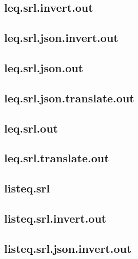 \subsection{leq.srl.invert.out}
\label{app:leq_srl.invert.out}

\subsection{leq.srl.json.invert.out}
\label{app:leq_srl.json.invert.out}

\subsection{leq.srl.json.out}
\label{app:leq_srl.json.out}

\subsection{leq.srl.json.translate.out}
\label{app:leq_srl.json.translate.out}

\subsection{leq.srl.out}
\label{app:leq_srl.out}

\subsection{leq.srl.translate.out}
\label{app:leq_srl.translate.out}

\subsection{listeq.srl}
\label{app:listeq_srl}

\subsection{listeq.srl.invert.out}
\label{app:listeq_srl.invert.out}

\subsection{listeq.srl.json.invert.out}
\label{app:listeq_srl.json.invert.out}

